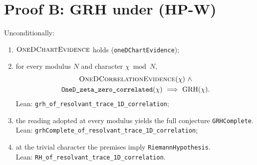 \section{Proof B: GRH under (HP-W)}\label{sec:grh-proofB}

\begin{theorem}\label{thm:grh-routeB}
Unconditionally:
\begin{enumerate}[label=\textup{(\roman*)},leftmargin=*,nosep]
\item \(\textsc{OneDChartEvidence}\) holds
(\texttt{oneDChartEvidence});
\item for every modulus \(N\) and character \(\chi\bmod N\),
\[
\begin{gathered}
\textsc{OneDCorrelationEvidence}(\chi)\ \wedge\\
\texttt{OneD\_zeta\_zero\_correlated}(\chi)
\ \Longrightarrow\ \mathrm{GRH}(\chi).
\end{gathered}
\]
Lean: \texttt{grh\_of\_resolvant\_trace\_1D\_correlation};
\item the reading adopted at every modulus yields the full conjecture
\texttt{GRHComplete}.\\
Lean: \texttt{grhComplete\_of\_resolvant\_trace\_1D\_correlation};
\item at the trivial character the premises imply
\texttt{RiemannHypothesis}.\\
Lean: \texttt{RH\_of\_resolvant\_trace\_1D\_correlation}.
\end{enumerate}
\end{theorem}

